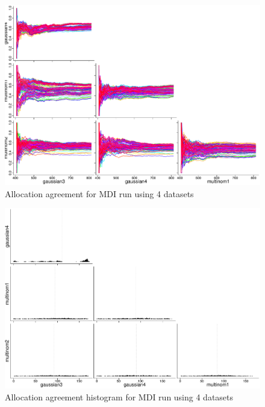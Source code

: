 \documentclass[10pt,a4paper]{article}
\begin{document}
\begin{landscape}
\begin{figure}[htbp]
\label{fig:agreement}
\includegraphics[width = 0.95\linewidth]{Plots/agreement.pdf}
\caption{Allocation agreement for MDI run using 4 datasets}
\end{figure}
\newpage
\begin{figure}[htbp]
\label{fig:agreement_hist}
\includegraphics[width = 0.95\linewidth]{Plots/agreement_hist.pdf}
\caption{Allocation agreement histogram for MDI run using 4 datasets}
\end{figure}
\end{landscape}
\end{document}
